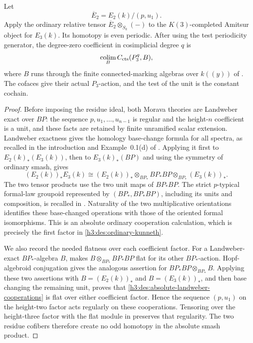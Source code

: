 \begin{lemma}\label{h3:des:residue-cooperations}
Let
\[
 \overline E_2=E_2(k)/(p,u_1).
\]
Apply the ordinary relative tensor \(\overline E_2\otimes_{S_k}(-)\)
to the \(K(3)\)-completed Amitsur object for \(E_3(k)\).  Its homotopy is
even periodic.  After using the test periodicity generator, the
degree-zero coefficient in cosimplicial degree \(q\) is
\[
 \operatorname*{colim}_B C_{\mathrm{cts}}(P_3^q,B),
\]
where \(B\) runs through the finite connected-marking algebras
over \(k((y))\) of .  The cofaces give their
actual \(P_3\)-action, and the test of the unit is the constant
cochain.
\end{lemma}

\begin{proof}
Before imposing the residue ideal, both Morava theories are
Landweber exact over \(BP\): the sequence
\(p,u_1,\ldots,u_{n-1}\) is regular and the height-\(n\) coefficient
is a unit, and these facts are retained by finite unramified scalar
extension.  Landweber exactness gives
the homology base-change formula for all spectra, as recalled in the
introduction and Example~0.1(d) of \cite{HoveyStrickland}.  Applying it
first to \(E_2(k)_*(E_3(k))\), then to \(E_3(k)_*(BP)\) and using the
symmetry of ordinary smash, gives
\begin{equation}\label{h3:des:absolute-landweber-cooperations}
 (E_2(k))_*E_3(k)
 \cong (E_2(k))_*\otimes_{BP_*}BP_*BP
                 \otimes_{BP_*}(E_3(k))_*.
\end{equation}
The two tensor products use the two unit maps of \(BP_*BP\).
The strict \(p\)-typical formal-law groupoid represented by
\((BP_*,BP_*BP)\), including its units and composition, is recalled in
\cite[Section~2, Lemma~2.9 and the following discussion, p.~7]{BhattacharyaEgger2019}.
Naturality of the two multiplicative orientations identifies these
base-changed operations with those of the oriented formal isomorphisms.
This is an absolute ordinary cooperation calculation,
which is precisely the first factor in
\eqref{h3:des:ordinary-kunneth}.

We also record the needed flatness over each coefficient factor.
For a Landweber-exact \(BP_*\)-algebra \(B\),
\cite[Lemma~2.2]{HoveyStrickland} makes
\(B\otimes_{BP_*}BP_*BP\) flat for its other \(BP_*\)-action.
Hopf-algebroid conjugation gives the analogous assertion for
\(BP_*BP\otimes_{BP_*}B\).  Applying these two assertions with
\(B=(E_2(k))_*\) and \(B=(E_3(k))_*\), and then base changing the
remaining unit, proves that
\eqref{h3:des:absolute-landweber-cooperations} is flat over either
coefficient factor.  Hence the sequence \((p,u_1)\) on the height-two
factor acts regularly on these cooperations.
Tensoring over the height-three factor with the flat module in
 preserves that regularity.  The two
residue cofibers therefore create no odd homotopy in the absolute
smash product.


\end{proof}
